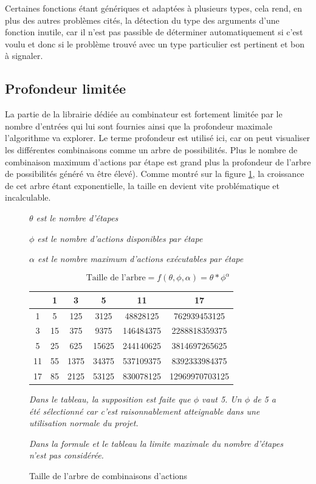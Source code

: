 \documentclass[a4paper]{report}
\begin{document}
Certaines fonctions étant génériques et adaptées à plusieurs types, cela rend, en plus des autres problèmes cités, la détection du type des arguments d'une fonction inutile, car il n'est pas passible de déterminer automatiquement si c'est voulu et donc si le problème trouvé avec un type particulier est pertinent et bon à signaler.



\subsection{Profondeur limitée}
La partie de la librairie dédiée au combinateur est fortement limitée par le nombre d'entrées qui lui sont fournies ainsi que la profondeur maximale l'algorithme va explorer.
Le terme profondeur est utilisé ici, car on peut visualiser les différentes combinaisons comme un arbre de possibilités.
Plus le nombre de combinaison maximum d'actions par étape est grand plus la profondeur de l'arbre de possibilités généré va être élevé).
Comme montré sur la figure \ref{fig:combinaisons_tree}, la croissance de cet arbre étant exponentielle, la taille en devient vite problématique et incalculable.

\begin{figure}[ht]
	\textit{$ \theta $ est le nombre d'étapes}
	
	\textit{$\phi$ est le nombre d'actions disponibles par étape}
	
	\textit{$\alpha$ est le nombre maximum d'actions exécutables par étape}
	
	$$ \text{Taille de l'arbre} = f(\theta, \phi, \alpha ) = \theta*\phi^{\alpha} $$
	
	\begin{center}
	\begin{tabular}{c||c|c|c|c|c}
	\hbox{\diagbox{$ \theta $}{$\alpha$}}
	 & 1 & 3 & 5 & 11 & 17\\ 
	\hline 
	\hline 
	1 & 5 & 125 & 3125 & 48828125 & 762939453125 \\
	\hline 
	3 & 15 & 375 & 9375 & 146484375 & 2288818359375 \\
	\hline 
	5 & 25 & 625 & 15625 & 244140625 & 3814697265625 \\
	\hline 
	11 & 55 & 1375 & 34375 & 537109375 & 8392333984375 \\
	\hline 
	17 & 85 & 2125 & 53125 & 830078125 & 12969970703125
	\end{tabular}
	\end{center}
	
	\textit{Dans le tableau, la supposition est faite que $ \phi $ vaut 5.
	Un $ \phi $ de 5 a été sélectionné car c'est raisonnablement atteignable dans une utilisation normale du projet.}
	
	\textit{Dans la formule et le tableau la limite maximale du nombre d'étapes n'est pas considérée.}
	\caption{Taille de l'arbre de combinaisons d'actions}
	
	\label{fig:combinaisons_tree}
\end{figure}
\end{document}
